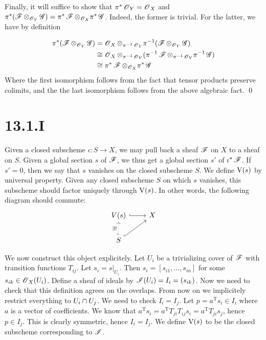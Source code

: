 \documentclass{article}
\begin{document}
Finally, it will suffice to show that $\pi^*\operatorname{\mathscr{O}}_Y=\operatorname{\mathscr{O}}_X$ and
$\pi^*(\operatorname{\mathscr{F}} \otimes_{\operatorname{\mathscr{O}}_Y} \operatorname{\mathscr{G}})=\pi^*\operatorname{\mathscr{F}} \otimes_{\operatorname{\mathscr{O}}_X} \pi^*\operatorname{\mathscr{G}}$. Indeed, the former is trivial. For the latter, we have
by definition

\begin{align*}
    \pi^*(\operatorname{\mathscr{F}} \otimes_{\operatorname{\mathscr{O}}_Y} \operatorname{\mathscr{G}}) & =\operatorname{\mathscr{O}}_X \otimes_{\pi^{-1}\operatorname{\mathscr{O}}_Y} \pi^{-1}(\operatorname{\mathscr{F}} \otimes_{\operatorname{\mathscr{O}}_Y} \operatorname{\mathscr{G}})                      \\
                                      & \cong \operatorname{\mathscr{O}}_X \otimes_{\pi^{-1}\operatorname{\mathscr{O}}_Y} (\pi^{-1}\operatorname{\mathscr{F}} \otimes_{\pi^{-1}\operatorname{\mathscr{O}}_Y} \pi^{-1}\operatorname{\mathscr{G}}) \\
                                      & \cong \pi^*\operatorname{\mathscr{F}} \otimes_{\operatorname{\mathscr{O}}_X} \pi^*\operatorname{\mathscr{G}}
\end{align*}
Where the first isomorphism follows from the fact that tensor products preserve
colimits, and the the last isomorphism follows from the above algebraic fact.
\qed

\section{13.1.I}
Given a closed subscheme $\iota: S \to X$, we may pull back a sheaf
$\operatorname{\mathscr{F}}$ on $X$ to a sheaf on
$S$. Given a global section $s$ of
$\operatorname{\mathscr{F}}$, we thus get a global section $s'$
of $\iota^*\operatorname{\mathscr{F}}$. If $s'=0$, then we say that
$s$ vanishes on the closed subscheme
$S$. We define $\operatorname{V}(s)$ by universal
property. Given any closed subscheme $S$ on which
$s$ vanishes, this subscheme should factor uniquely through
$\operatorname{V}(s)$. In other words, the following diagram should commute:
\[\begin{tikzcd}
        {V(s)} & X \\
        S
        \arrow[hook, from=1-1, to=1-2]
        \arrow[hook, from=2-1, to=1-2]
        \arrow["{\exists!}", dotted, hook, from=2-1, to=1-1]
    \end{tikzcd}\]

We now construct this object explicitely. Let $U_i$ be a
trivializing cover of $\operatorname{\mathscr{F}}$ with transition functions
$T_{ij}$. Let $s_i=s|_{U_i}$. Then
$s_i=[s_{i1}, \dots, s_{in}]$ for some $s_{ik} \in \operatorname{\mathscr{O}}_X(U_i)$. Define a sheaf of
ideals by $\operatorname{\mathscr{I}}(U_i)=I_i=(s_{ik})$. Now we need to check that this definition
agrees on the overlaps. From now on we implicitely restrict everything to
$U_i \cap U_j$. We need to check $I_i=I_j$. Let
$p=a^\text{T} s_i \in I_i$ where $a$ is a vector of
coefficients. We know that $a^\text{T} s_i=a^\text{T}
    T_{ji}T_{ij} s_i=a^\text{T}
    T_{ji} s_j$, hence
$p \in I_j$. This is clearly symmetric, hence
$I_i=I_j$. We define $\operatorname{V}(s)$ to be the closed
subscheme corresponding to $\operatorname{\mathscr{I}}$.
\end{document}
